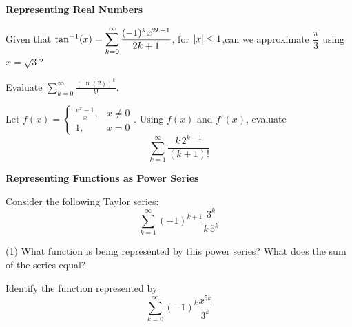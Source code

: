 \documentclass[../mathNotesPreamble]{subfiles}
\begin{document}
    \textbf{Representing Real Numbers}
      \begin{ex*}[\textcolor{blue}{LC 31.7}]
        Given that $\displaystyle\tan^{-1}(x)=\sum_{k=0}^\infty \frac{(-1)^k x^{2k+1}}{2k+1}$, for ${\left\vert x\right\vert}\leq 1$,\newline can we approximate $\dfrac{\pi}{3}$ using $x=\sqrt{3}$?
      \end{ex*}

      \begin{ex*}[\textcolor{blue}{LC 31.8}]
        Evaluate $\displaystyle \sum_{k=0}^\infty \frac{(\ln(2))^k}{k!}$.
      \end{ex*}
      \pagebreak

      \begin{ex*}
        Let $f(x)=\begin{cases}
          \frac{e^x-1}{x},& x\neq 0\\
          1,& x=0
        \end{cases}$. Using $f(x)$ and $f'(x)$, evaluate 
          \[\sum_{k=1}^\infty \frac{k\,2^{k-1}}{(k+1)!}\]
      \end{ex*}
      \pagebreak

    \textbf{Representing Functions as Power Series}
      \begin{ex*}[\textcolor{blue}{LC 31.9-31.10}]
        Consider the following Taylor series:
          \[\sum_{k=1}^\infty (-1)^{k+1}\frac{3^k}{k\,5^k}\]
      \end{ex*}
      \begin{tasks}[after-item-skip=\stretch{1}, label=,item-indent=0pt](1)
        \task What function is being represented by this power series?
        \task What does the sum of the series equal?
      \end{tasks}
      \pagebreak

      \begin{ex*}
        Identify the function represented by  
          \[\sum_{k=0}^\infty (-1)^k \frac{x^{5k}}{3^k}\]
      \end{ex*}
      \pagebreak
    
\end{document}
